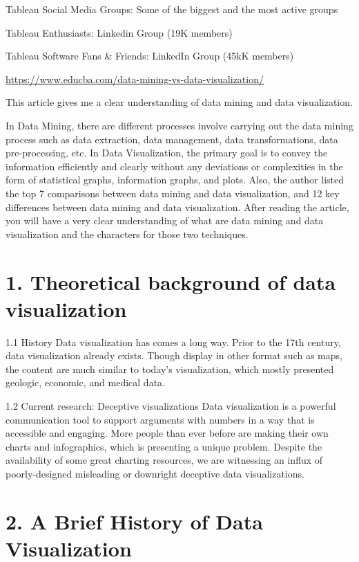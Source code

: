 \documentclass[]{book}
\theoremstyle{definition}
\theoremstyle{definition}
\theoremstyle{definition}
\theoremstyle{remark}
\begin{document}
Tableau Social Media Groups: Some of the biggest and the most active
groups

Tableau Enthusiasts: Linkedin Group (19K members)

Tableau Software Fans \& Friends: LinkedIn Group (45kK members)

\citep{LinkedIn_Groups}

\url{https://www.educba.com/data-mining-vs-data-visualization/}

This article gives me a clear understanding of data mining and data
visualization.

In Data Mining, there are different processes involve carrying out the
data mining process such as data extraction, data management, data
transformations, data pre-processing, etc. In Data Visualization, the
primary goal is to convey the information efficiently and clearly
without any deviations or complexities in the form of statistical
graphs, information graphs, and plots. Also, the author listed the top 7
comparisons between data mining and data visualization, and 12 key
differences between data mining and data visualization. After reading
the article, you will have a very clear understanding of what are data
mining and data visualization and the characters for those two
techniques.

\section{1. Theoretical background of data
visualization}\label{theoretical-background-of-data-visualization}

1.1 History Data visualization has comes a long way. Prior to the 17th
century, data visualization already exists. Though display in other
format such as maps, the content are much similar to today's
visualization, which mostly presented geologic, economic, and medical
data.

1.2 Current research: Deceptive visualizations Data visualization is a
powerful communication tool to support arguments with numbers in a way
that is accessible and engaging. More people than ever before are making
their own charts and infographics, which is presenting a unique problem.
Despite the availability of some great charting resources, we are
witnessing an influx of poorly-designed misleading or downright
deceptive data visualizations.

\section{2. A Brief History of Data
Visualization}\label{a-brief-history-of-data-visualization-1}
\end{document}
